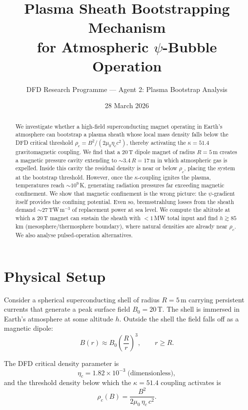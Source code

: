 \documentclass[12pt,a4paper]{article}
\title{Plasma Sheath Bootstrapping Mechanism\\for Atmospheric $\psi$-Bubble Operation}
\author{DFD Research Programme --- Agent 2: Plasma Bootstrap Analysis}
\date{28 March 2026}
\begin{document}
\maketitle

\begin{abstract}
We investigate whether a high-field superconducting magnet operating in Earth's atmosphere
can bootstrap a plasma sheath whose local mass density falls below the DFD critical
threshold $\rho_c = B^2/(2\mu_0 \eta_c c^2)$, thereby activating the $\kappa = 51.4$
gravitomagnetic coupling.  We find that a 20\,T dipole magnet of radius $R=5$\,m creates
a magnetic pressure cavity extending to $\sim 3.4\,R = 17$\,m in which atmospheric gas
is expelled.  Inside this cavity the residual density is near or below $\rho_c$, placing
the system at the bootstrap threshold.  However, once the $\kappa$-coupling ignites the
plasma, temperatures reach $\sim 10^9$\,K, generating radiation pressures far exceeding
magnetic confinement.  We show that magnetic confinement is the wrong picture: the
$\psi$-gradient itself provides the confining potential.  Even so, bremsstrahlung losses
from the sheath demand $\sim 27$\,TW\,m$^{-3}$ of replacement power at sea level.  We
compute the altitude at which a 20\,T magnet can sustain the sheath with $<1$\,MW total
input and find $h \gtrsim 85$\,km (mesosphere/thermosphere boundary), where natural
densities are already near $\rho_c$.  We also analyse pulsed-operation alternatives.
\end{abstract}

\tableofcontents
\newpage

\section{Physical Setup}

Consider a spherical superconducting shell of radius $R = 5$\,m carrying persistent
currents that generate a peak surface field $B_0 = 20$\,T.  The shell is immersed in
Earth's atmosphere at some altitude $h$.  Outside the shell the field falls off as a
magnetic dipole:
\begin{equation}
  B(r) \approx B_0 \left(\frac{R}{r}\right)^3 , \qquad r \geq R.
  \label{eq:dipole}
\end{equation}

The DFD critical density parameter is
\begin{equation}
  \eta_c = 1.82 \times 10^{-3} \; \text{(dimensionless)},
\end{equation}
and the threshold density below which the $\kappa = 51.4$ coupling activates is
\begin{equation}
  \rho_c(B) = \frac{B^2}{2\mu_0 \, \eta_c \, c^2}.
  \label{eq:rhoc}
\end{equation}
\end{document}
